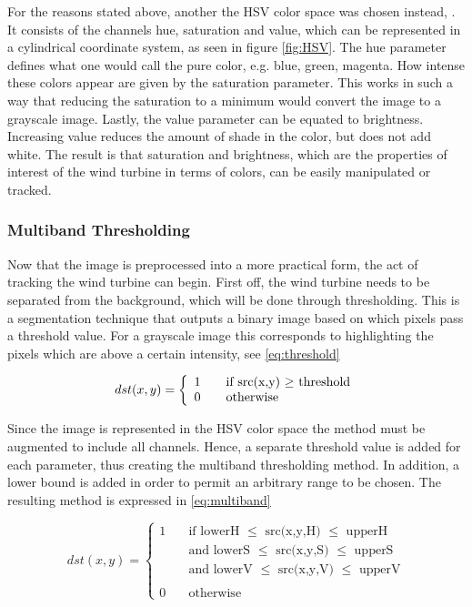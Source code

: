 \documentclass[a4paper,10pt]{article}
\begin{document}
    For the reasons stated above, another the HSV color space was chosen instead, \citet{Smith:1978:CGT:965139.807361}. It consists of the channels hue, saturation and value, which can be represented in a cylindrical coordinate system, as seen in figure \ref{fig:HSV}. The hue parameter defines what one would call the pure color, e.g. blue, green, magenta. How intense these colors appear are given by the saturation parameter. This works in such a way that reducing the saturation to a minimum would convert the image to a grayscale image. Lastly, the value parameter can be equated to brightness. Increasing value reduces the amount of shade in the color, but does not add white. The result is that saturation and brightness, which are the properties of interest of the wind turbine in terms of colors, can be easily manipulated or tracked.
      
    \subsubsection{Multiband Thresholding}
    \label{sec:multiband thresholding}
    Now that the image is preprocessed into a more practical form, the act of tracking the wind turbine can begin. First off, the wind turbine needs to be separated from the background, which will be done through thresholding. This is a segmentation technique that outputs a binary image based on which pixels pass a threshold value. For a grayscale image this corresponds to highlighting the pixels which are above a certain intensity, see \eqref{eq:threshold}

    \begin{equation}
    \label{eq:threshold}
	 dst(x,y) = \left\{
	    \begin{array}{l l}
	      1 & \quad \text{if src(x,y)  $\geq$ threshold}\\
	      0 & \quad \text{otherwise} 
	    \end{array} \right.
    \end{equation}
    
    Since the image is represented in the HSV color space the method must be augmented to include all channels. Hence, a separate threshold value is added for each parameter, thus creating the multiband thresholding method. In addition, a lower bound is added in order to permit an arbitrary range to be chosen. The resulting method is expressed in \eqref{eq:multiband}
    
    \begin{equation}
    \label{eq:multiband}
	 dst(x,y) = \left\{
	    \begin{array}{lllll}
	      1 & \quad \text{if lowerH $\leq$ src(x,y,H) $\leq$ upperH}\\
	      & \quad \text{and lowerS $\leq$ src(x,y,S) $\leq$ upperS}\\
	      & \quad \text{and lowerV $\leq$ src(x,y,V) $\leq$ upperV}\\
	      \\
	      0 & \quad \text{otherwise} 
	    \end{array} \right.
    \end{equation}
    
\end{document}
